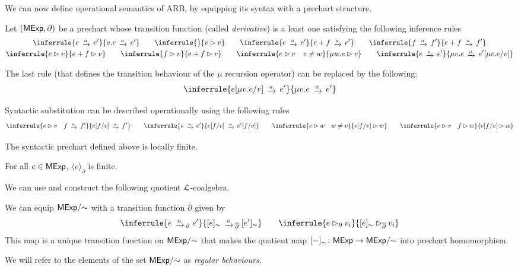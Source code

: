 We can now define operational semantics of ARB, by equipping its syntax with a prechart structure.
\begin{definition}\label{def:operational_semantics}
	Let $(\mathsf{MExp}, \partial)$ be a prechart whose transition function (called \emph{derivative}) is a least one satisfying the following inference rules
	\begin{gather*}
		\inferrule{e \tr{a} e' }{a.e \tr{a} e'} \qquad \inferrule{ }{v \rhd v} \qquad \inferrule{e \tr{a} e'}{e + f \tr{a} e'} \qquad \inferrule{f \tr{a} f'}{e + f \tr{a} f'}\\
		\inferrule {e \rhd v}{e + f \rhd v} \qquad \inferrule {f \rhd v}{e + f \rhd v} \qquad \inferrule{e \rhd v\quad v \neq w}{\mu w.e \rhd v } \qquad \inferrule{e \tr{a} e'}{\mu v. e \tr{a} e'[\mu v .e / v]}
	\end{gather*}
\end{definition}
\begin{remark}
	The last rule (that defines the transition behaviour of the $\mu$ recursion operator) can be replaced by the following:
	\begin{gather*}
		\inferrule{e[\mu v. e / v] \tr{a} e'}{\mu v. e \tr{a} e'}
	\end{gather*}
\end{remark}

\begin{remark}\label{rem:semantic-substitution}
	Syntactic substitution can be described operationally using the following rules
	\begin{gather*}
		\inferrule{e \rhd v\quad f\tr{a} f'}{e[f / v] \tr{a} f'}\qquad \inferrule{e \tr{a} e'}{e[f / v] \tr{a} e'[f/v]}\qquad \inferrule{e \rhd w \quad w \neq v }{e[f/v] \rhd w} \qquad \inferrule{e \rhd v \quad f \rhd w}{e[f/v] \rhd w}
	\end{gather*}
\end{remark}
The syntactic prechart defined above is locally finite.
\begin{lemma}
	For all $e \in \mathsf{MExp}$, $\langle e \rangle_\partial$ is finite.
\end{lemma}
We can use  and construct the following quotient $\mathcal{L}$-coalgebra.
\begin{lemma}\label{lem:quotient_chart}	
	We can equip ${\mathsf{MExp}}/{\sim}$ with a transition function $\overline\partial$ given by
	$$
	\inferrule{e \tr{a}_\partial e'}{[e]_\sim \tr{a}_{\overline\partial} [e']_\sim} \qquad \inferrule{e \rhd_{\partial} v_i}{[e]_\sim \rhd_{\overline{\partial}} v_i}
	$$
	This map is a unique transition function on ${\mathsf{MExp}}/{\sim}$ that makes the quotient map $[-]_{\sim} \colon \mathsf{MExp} \to {\mathsf{MExp}}/{\sim}$ into prechart homomorphism.
\end{lemma}
We will refer to the elements of the set $\mathsf{MExp}/{\sim}$ as \emph{regular behaviours}.

